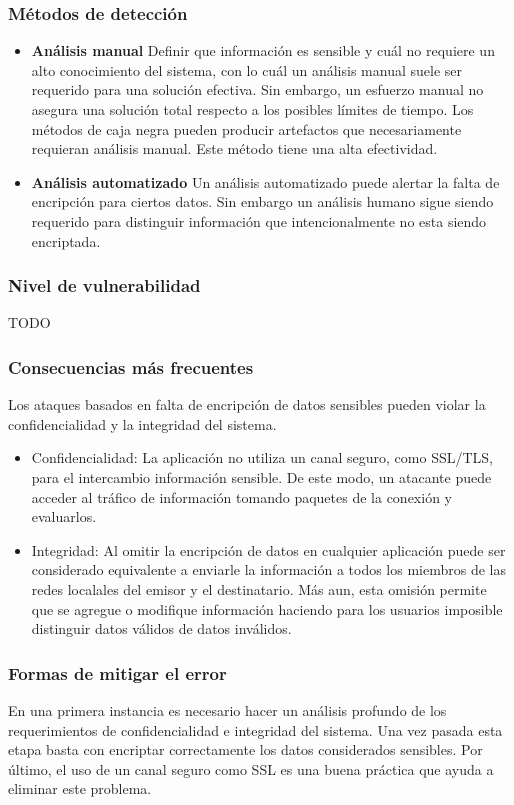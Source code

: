 \subsubsection{Métodos de detección}
\begin{itemize}
 \item \textbf{Análisis manual}
	Definir que información es sensible y cuál no requiere un alto conocimiento del sistema, con lo cuál un análisis manual suele ser requerido para una solución efectiva.
	Sin embargo, un esfuerzo manual no asegura una solución total respecto a los posibles límites de tiempo.
	Los métodos de caja negra pueden producir artefactos que necesariamente requieran análisis manual.
	Este método tiene una alta efectividad.
  \item \textbf{Análisis automatizado}
  Un análisis automatizado puede alertar la falta de encripción para ciertos datos.
  Sin embargo un análisis humano sigue siendo requerido para distinguir información que intencionalmente no esta siendo encriptada.
\end{itemize}

\subsubsection{Nivel de vulnerabilidad}

TODO

\subsubsection{Consecuencias más frecuentes}

Los ataques basados en falta de encripción de datos sensibles pueden violar la confidencialidad y la integridad del sistema.

\begin{itemize}
 \item Confidencialidad: La aplicación no utiliza un canal seguro, como SSL/TLS, para  el intercambio información sensible.
	De este modo, un atacante puede acceder al tráfico de información tomando paquetes de la conexión y evaluarlos.
 \item Integridad: Al omitir la encripción de datos en cualquier aplicación puede ser considerado equivalente a enviarle la información a todos los miembros de las redes localales del
	emisor y el destinatario. Más aun, esta omisión permite que se agregue o modifique información haciendo para los usuarios imposible distinguir datos válidos de datos inválidos.
\end{itemize}

\subsubsection{Formas de mitigar el error}

En una primera instancia es necesario hacer un análisis profundo de los requerimientos de confidencialidad e integridad del sistema.
Una vez pasada esta etapa basta con encriptar correctamente los datos considerados sensibles.
Por último, el uso de un canal seguro como SSL es una buena práctica que ayuda a eliminar este problema.
